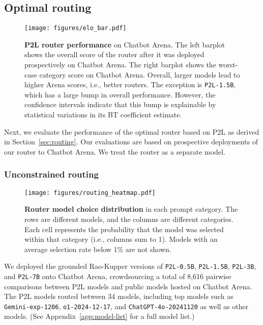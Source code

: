 \subsection{Optimal routing}
\label{sec:routing-experiments}
\begin{figure}[ht]
    \centering
    \texttt{[image: figures/elo\_bar.pdf]}
    \caption{\textbf{P2L router performance} on Chatbot Arena. The left barplot shows the overall score of the router after it was deployed prospectively on Chatbot Arena. The right barplot shows the worst-case category score on Chatbot Arena. Overall, larger models lead to higher Arena scores, i.e., better routers. The exception is \texttt{P2L-1.5B}, which has a large bump in overall performance. However, the confidence intervals indicate that this bump is explainable by statistical variations in its BT coefficient estimate.}
    \label{fig:scores-scaling}
    \vspace{-5.0pt}
\end{figure}

Next, we evaluate the performance of the optimal router based on P2L as derived in Section~\ref{sec:routing}.
Our evaluations are based on prospective deployments of our router to Chatbot Arena.
We treat the router as a separate model.

\subsubsection{Unconstrained routing}

\begin{figure}[t]
    \centering
    \texttt{[image: figures/routing\_heatmap.pdf]}
    \caption{\textbf{Router model choice distribution} in each prompt category. The rows are different models, and the columns are different categories. Each cell represents the probability that the model was selected within that category (i.e., columns sum to 1). Models with an average selection rate below 1\% are not shown.}
    \label{fig:routing_heatmap}
\end{figure}

We deployed the grounded Rao-Kupper versions of \texttt{P2L-0.5B}, \texttt{P2L-1.5B}, \texttt{P2L-3B}, and \texttt{P2L-7B} onto Chatbot Arena, crowdsourcing a total of 8,616 pairwise comparisons between P2L models and public models hosted on Chatbot Arena.
The P2L models routed between 34 models, including top models such as \texttt{Gemini-exp-1206}, \texttt{o1-2024-12-17}, and \texttt{ChatGPT-4o-20241120} as well as other models.
(See Appendix~\ref{app:model-list} for a full model list.)

